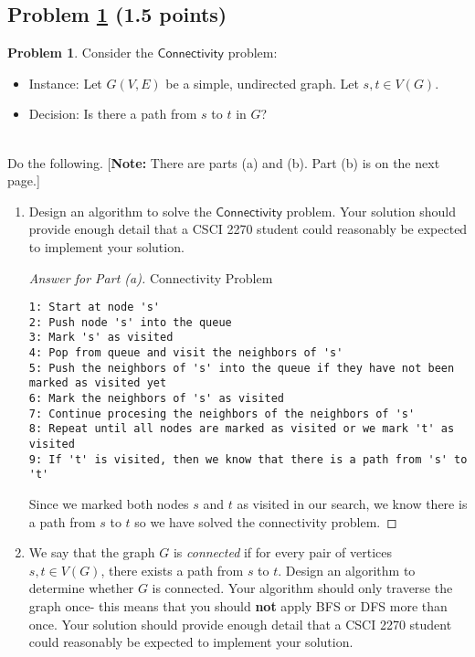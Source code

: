 \documentclass[11pt]{article}
\theoremstyle{definition}
\theoremstyle{definition}
\newtheorem{required}{Problem}
\theoremstyle{definition}
\begin{document}
\subsection{Problem \ref{DFS1} (1.5 points)}
\begin{required} \label{DFS1}
Consider the $\textsf{Connectivity}$ problem:
\begin{itemize}
\item \textsf{Instance:} Let $G(V, E)$ be a simple, undirected graph. Let $s, t \in V(G)$.
\item \textsf{Decision:} Is there a path from $s$ to $t$ in $G$?
\end{itemize}

\noindent \\ Do the following. [\textbf{Note:} There are parts (a) and (b). Part (b) is on the next page.]
\begin{enumerate}[label=(\alph*)]
\item Design an algorithm to solve the $\textsf{Connectivity}$ problem. Your solution should provide enough detail that a CSCI 2270 student could reasonably be expected to implement your solution.
\begin{proof}[Answer for Part (a)]
Connectivity Problem\\
\begin{verbatim}
1: Start at node 's'
2: Push node 's' into the queue
3: Mark 's' as visited
4: Pop from queue and visit the neighbors of 's'
5: Push the neighbors of 's' into the queue if they have not been marked as visited yet
6: Mark the neighbors of 's' as visited
7: Continue procesing the neighbors of the neighbors of 's'
8: Repeat until all nodes are marked as visited or we mark 't' as visited
9: If 't' is visited, then we know that there is a path from 's' to 't'
\end{verbatim}
Since we marked both nodes $s$ and $t$ as visited in our search, we know there is a path from $s$ to $t$ so we have solved the connectivity problem.
\end{proof}



\newpage
\item We say that the graph $G$ is \textit{connected} if for every pair of vertices $s, t \in V(G)$, there exists a path from $s$ to $t$. Design an algorithm to determine whether $G$ is connected. Your algorithm should only traverse the graph once- this means that you should \textbf{not} apply BFS or DFS more than once. Your solution should provide enough detail that a CSCI 2270 student could reasonably be expected to implement your solution.


\end{enumerate}
\end{required}
\end{document}
